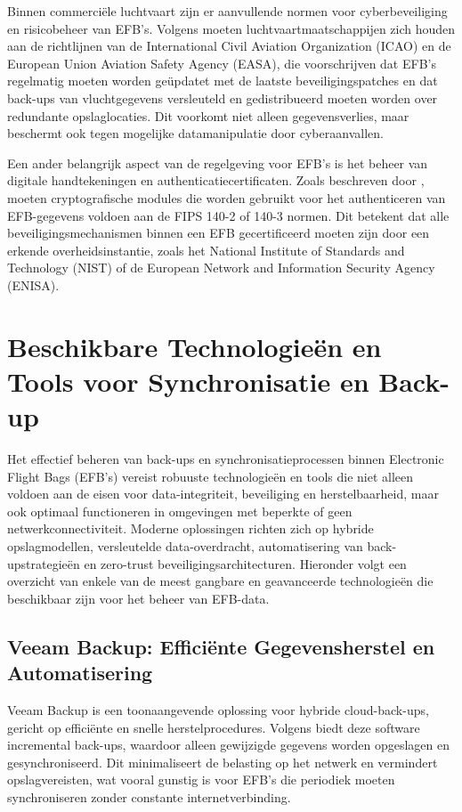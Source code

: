 Binnen commerciële luchtvaart zijn er aanvullende normen voor cyberbeveiliging en risicobeheer van EFB’s. Volgens \textcite{EFBDataSecurity} moeten luchtvaartmaatschappijen zich houden aan de richtlijnen van de International Civil Aviation Organization (ICAO) en de European Union Aviation Safety Agency (EASA), die voorschrijven dat EFB’s regelmatig moeten worden geüpdatet met de laatste beveiligingspatches en dat back-ups van vluchtgegevens versleuteld en gedistribueerd moeten worden over redundante opslaglocaties. Dit voorkomt niet alleen gegevensverlies, maar beschermt ook tegen mogelijke datamanipulatie door cyberaanvallen.

Een ander belangrijk aspect van de regelgeving voor EFB’s is het beheer van digitale handtekeningen en authenticatiecertificaten. Zoals beschreven door \textcite{NISTFIPS140}, moeten cryptografische modules die worden gebruikt voor het authenticeren van EFB-gegevens voldoen aan de FIPS 140-2 of 140-3 normen. Dit betekent dat alle beveiligingsmechanismen binnen een EFB gecertificeerd moeten zijn door een erkende overheidsinstantie, zoals het National Institute of Standards and Technology (NIST) of de European Network and Information Security Agency (ENISA).

        
\section{Beschikbare Technologieën en Tools voor Synchronisatie en Back-up}

Het effectief beheren van back-ups en synchronisatieprocessen binnen Electronic Flight Bags (EFB’s) vereist robuuste technologieën en tools die niet alleen voldoen aan de eisen voor data-integriteit, beveiliging en herstelbaarheid, maar ook optimaal functioneren in omgevingen met beperkte of geen netwerkconnectiviteit. Moderne oplossingen richten zich op hybride opslagmodellen, versleutelde data-overdracht, automatisering van back-upstrategieën en zero-trust beveiligingsarchitecturen. Hieronder volgt een overzicht van enkele van de meest gangbare en geavanceerde technologieën die beschikbaar zijn voor het beheer van EFB-data.

\subsection{Veeam Backup: Efficiënte Gegevensherstel en Automatisering}
\label{subsec:veeam}

Veeam Backup is een toonaangevende oplossing voor hybride cloud-back-ups, gericht op efficiënte en snelle herstelprocedures. Volgens \textcite{VeeamRTO} biedt deze software incremental back-ups, waardoor alleen gewijzigde gegevens worden opgeslagen en gesynchroniseerd. Dit minimaliseert de belasting op het netwerk en vermindert opslagvereisten, wat vooral gunstig is voor EFB’s die periodiek moeten synchroniseren zonder constante internetverbinding. 

